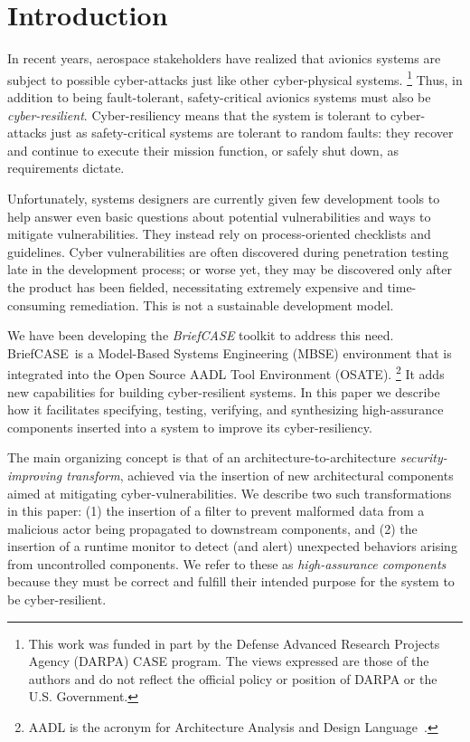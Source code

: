 \documentclass[global,twocolumn]{svjour}
\newcommand{\brfcs}{BriefCASE}
\begin{document}

\section{Introduction} \label{sec:intro}
In recent years, aerospace stakeholders have realized that avionics systems are subject to possible cyber-attacks just like other cyber-physical systems.
%
\footnote{This work was funded in part by the
Defense Advanced Research Projects Agency (DARPA) CASE program.
%
The views expressed are those of the authors and do not reflect the official
policy or position of DARPA or the U.S. Government.}
%
Thus, in addition to being fault-tolerant, safety-critical avionics systems must also be {\em cyber-resilient}.
%
Cyber-resiliency means that the system is tolerant to cyber-attacks just as safety-critical systems are tolerant to random faults: they recover and continue to execute their mission function, or safely shut down, as requirements dictate.

Unfortunately, systems designers are currently given few development tools to help answer even basic questions about potential vulnerabilities and ways to mitigate vulnerabilities.
%
They instead rely on process-oriented checklists and guidelines.
%
Cyber vulnerabilities are often discovered during penetration testing late in the development process;
%
or worse yet, they may be discovered only after the product has been fielded, necessitating extremely expensive and time-consuming remediation. This is not a sustainable development model.

We have been developing the {\em BriefCASE} toolkit to address this need.
%
\brfcs\ is a Model-Based Systems Engineering (MBSE) environment that is integrated into the Open Source AADL Tool Environment (OSATE).
%
\footnote{AADL is the acronym for Architecture Analysis and Design Language~\cite{aadl}.}
%
It adds new capabilities for building cyber-resilient systems.
%
In this paper we describe how it facilitates specifying, testing, verifying, and synthesizing high-assurance components inserted into a system to improve its cyber-resiliency.

The main organizing concept is that of an architecture-to-architecture \emph{security-improving transform}, achieved via the insertion of new architectural components aimed at mitigating cyber-vulnerabilities.
%
We describe two such transformations in this paper: (1) the insertion of a filter to prevent malformed data from a malicious actor being propagated to downstream components, and (2) the insertion of a runtime monitor to detect (and alert) unexpected behaviors arising from uncontrolled components.
%
We refer to these as \emph{high-assurance components} because they must be correct and fulfill their intended purpose for the system to be cyber-resilient.
\end{document}
